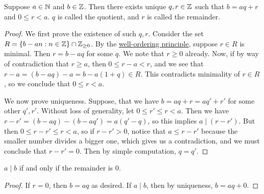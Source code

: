 \begin{theorem}\label{thm:division}
    Suppose \(a \in \mathbb{N}\) and \(b \in \mathbb{Z}\).
    Then there exists unique \(q,r \in \mathbb{Z}\)
    such that \(b = aq + r\) and \(0 \leq r < a\).
    \(q\) is called the quotient, and \(r\) is called the remainder.
\end{theorem}
\begin{proof}
    We first prove the existence of such \(q,r\).
    Consider the set \(R = \{b-an: n \in \mathbb{Z}\} \cap \mathbb{Z}_{\geq 0}\).
    By the \hyperref[ax:well-order]{well-ordering principle},
    suppose \(r \in R\) is minimal.
    Then \(r = b-aq\) for some \(q\).
    We note that \(r \geq 0\) already.
    Now, if by way of contradiction that \(r \geq a\),
    then \(0 \leq r-a < r\),
    and we see that \(r-a = (b-aq) - a = b - a(1+q) \in R\).
    This contradicts minimality of \(r \in R\),
    so we conclude that \(0 \leq r < a\).

    We now prove uniqueness.
    Suppose, that we have \(b = aq + r = aq' + r'\) for some other \(q',r'\).
    Without loss of generality, let \(0 \leq r' \leq r < a\).
    Then we have \(r-r' = (b-aq) - (b-aq') = a(q'-q)\),
    so this implies \(a \mid (r-r')\).
    But then \(0 \leq r-r' \leq r < a\),
    so if \(r-r' > 0\), notice that \(a \leq r-r'\) because the smaller number divides a bigger one,
    which gives us a contradiction,
    and we must conclude that \(r-r' = 0\).
    Then by simple computation, \(q = q'\).
\end{proof}
\begin{corollary}
    \(a \mid b\) if and only if the remainder is 0.
\end{corollary}
\begin{proof}
    If \(r = 0\), then \(b = aq\) as desired.
    If \(a \mid b\), then by uniqueness, \(b = aq + 0\).
\end{proof}

